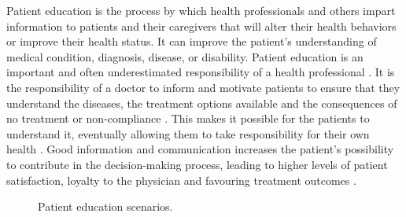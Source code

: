 Patient education is the process by which health professionals and others impart information to patients and their caregivers that will alter their health behaviors or improve their health status.%
It can improve the patient's understanding of medical condition, diagnosis, disease, or disability. Patient education is an important and often underestimated responsibility of a health professional \cite{Waitzkin1984}.
It is the responsibility of a doctor to inform and motivate patients to ensure that they understand the diseases, the treatment options available and the consequences of no treatment or non-compliance \cite{Fenol2010}. This makes it possible for the patients to understand it, eventually allowing them to take responsibility for their own health \cite{Ammann2010}. Good information and communication increases the patient's possibility to contribute in the decision-making process, leading to higher levels of patient satisfaction, loyalty to the physician and favouring treatment outcomes \cite{Huber2012b,Ammann2010,Cleeren2014}. 
\begin{figure}
	\centering
	\quad
	\caption{Patient education scenarios.}
	\label{fig:2-bg:patientEducation}
\end{figure}
